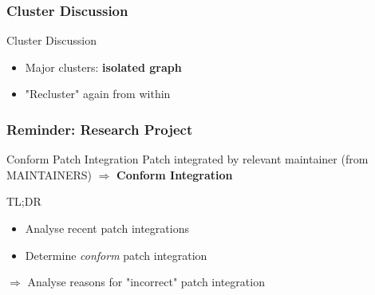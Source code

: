 \documentclass{beamer}
\begin{document}
	\begin{frame}
	\frametitle{Cluster Discussion}
		\begin{block}{Cluster Discussion}
			\begin{itemize}
				\item Major clusters: \textbf{isolated graph}
				\item "Recluster" again from within
			\end{itemize}
		\end{block}
		
	\end{frame}

	\begin{frame}
	\frametitle{Reminder: Research Project}
		\begin{alertblock}{Conform Patch Integration}
			Patch integrated by relevant maintainer (from MAINTAINERS) $\Rightarrow$ \textbf{Conform Integration}
		\end{alertblock}

		\begin{block}{TL;DR}
			\begin{itemize}
				\item Analyse recent patch integrations
				\item Determine \textit{conform} patch integration
			\end{itemize}
		\end{block}
		$\Rightarrow$ Analyse reasons for "incorrect" patch integration
	\end{frame}
\end{document}
